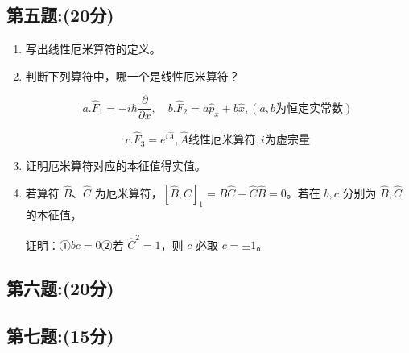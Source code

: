 \subsection{第五题:(20分)}
\begin{enumerate}
  \item 写出线性厄米算符的定义。
  
  \item 判断下列算符中，哪一个是线性厄米算符？
  
  $$ a. \hat{F}_1 = -i \hbar \frac{\partial}{\partial x}, \quad b. \hat{F}_2 = a \hat{p}_x + b \hat{x}, (a, b \text{为恒定实常数}) ~$$
  
  $$c. \hat{F}_3 = e^{i\hat A},\hat A \text{线性厄米算符}, i \text{为虚宗量}~$$
  
  \item 证明厄米算符对应的本征值得实值。
  
  \item 若算符 $\hat{B}$、$\hat{C}$ 为厄米算符，$[\hat{B}, \hat{C}]_1 = \hat{B} \hat{C} - \hat{C} \hat{B} = 0$。若在 $b, c$ 分别为 $\hat{B}, \hat{C}$ 的本征值，
  
  证明：①$ b c = 0$②若 $\hat{C}^2 = 1$，则 $c$ 必取 $c = \pm 1$。
\end{enumerate}
\subsection{第六题:(20分)}

\subsection{第七题:(15分)}